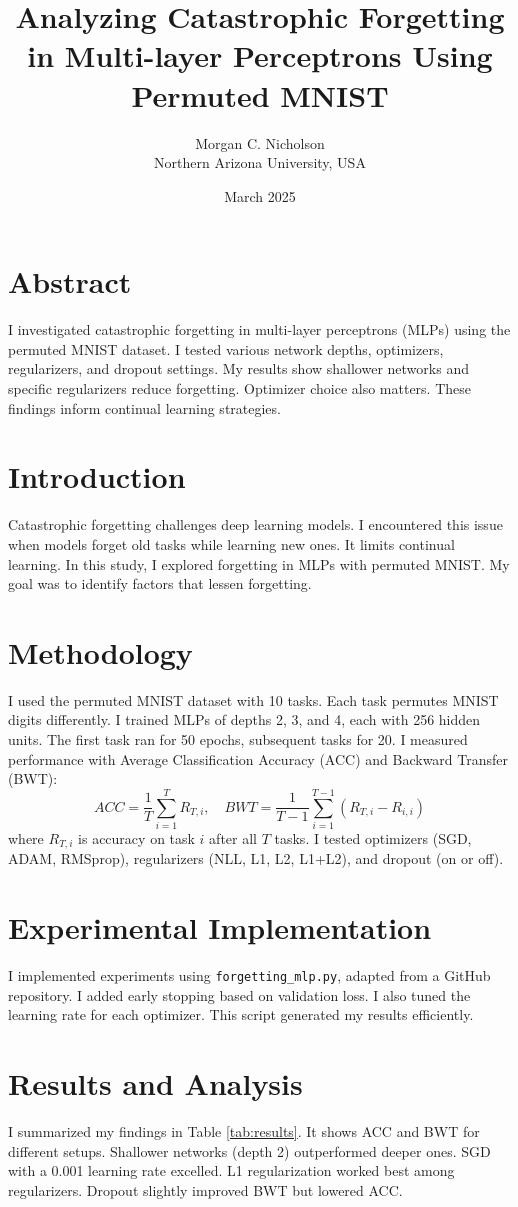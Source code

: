 \documentclass{article}
\title{Analyzing Catastrophic Forgetting in Multi-layer Perceptrons Using Permuted MNIST}
\author{Morgan C. Nicholson \\ Northern Arizona University, USA}
\date{March 2025}
\begin{document}
\maketitle

\section*{Abstract}
I investigated catastrophic forgetting in multi-layer perceptrons (MLPs) using the permuted MNIST dataset. I tested various network depths, optimizers, regularizers, and dropout settings. My results show shallower networks and specific regularizers reduce forgetting. Optimizer choice also matters. These findings inform continual learning strategies.

\section{Introduction}
Catastrophic forgetting challenges deep learning models. I encountered this issue when models forget old tasks while learning new ones. It limits continual learning. In this study, I explored forgetting in MLPs with permuted MNIST. My goal was to identify factors that lessen forgetting.

\section{Methodology}
I used the permuted MNIST dataset with 10 tasks. Each task permutes MNIST digits differently. I trained MLPs of depths 2, 3, and 4, each with 256 hidden units. The first task ran for 50 epochs, subsequent tasks for 20. I measured performance with Average Classification Accuracy (ACC) and Backward Transfer (BWT):
\[
ACC = \frac{1}{T} \sum_{i=1}^T R_{T,i}, \quad BWT = \frac{1}{T-1} \sum_{i=1}^{T-1} (R_{T,i} - R_{i,i})
\]
where \( R_{T,i} \) is accuracy on task \( i \) after all \( T \) tasks. I tested optimizers (SGD, ADAM, RMSprop), regularizers (NLL, L1, L2, L1+L2), and dropout (on or off).

\section{Experimental Implementation}
I implemented experiments using \texttt{forgetting\_mlp.py}, adapted from a GitHub repository. I added early stopping based on validation loss. I also tuned the learning rate for each optimizer. This script generated my results efficiently.

\section{Results and Analysis}
I summarized my findings in Table \ref{tab:results}. It shows ACC and BWT for different setups. Shallower networks (depth 2) outperformed deeper ones. SGD with a 0.001 learning rate excelled. L1 regularization worked best among regularizers. Dropout slightly improved BWT but lowered ACC.
\end{document}
